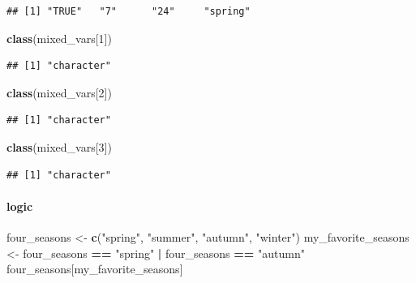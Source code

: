\documentclass[
]{book}
\newenvironment{Shaded}{\begin{snugshade}}{\end{snugshade}}
\newcommand{\DecValTok}[1]{\textcolor[rgb]{0.00,0.00,0.81}{#1}}
\newcommand{\FunctionTok}[1]{\textcolor[rgb]{0.13,0.29,0.53}{\textbf{#1}}}
\newcommand{\NormalTok}[1]{#1}
\newcommand{\OtherTok}[1]{\textcolor[rgb]{0.56,0.35,0.01}{#1}}
\newcommand{\SpecialCharTok}[1]{\textcolor[rgb]{0.81,0.36,0.00}{\textbf{#1}}}
\newcommand{\StringTok}[1]{\textcolor[rgb]{0.31,0.60,0.02}{#1}}
\theoremstyle{definition}
\theoremstyle{definition}
\theoremstyle{definition}
\theoremstyle{definition}
\theoremstyle{remark}
\begin{document}
\begin{verbatim}
## [1] "TRUE"   "7"      "24"     "spring"
\end{verbatim}

\begin{Shaded}
\begin{Highlighting}[]
\FunctionTok{class}\NormalTok{(mixed\_vars[}\DecValTok{1}\NormalTok{])}
\end{Highlighting}
\end{Shaded}

\begin{verbatim}
## [1] "character"
\end{verbatim}

\begin{Shaded}
\begin{Highlighting}[]
\FunctionTok{class}\NormalTok{(mixed\_vars[}\DecValTok{2}\NormalTok{])}
\end{Highlighting}
\end{Shaded}

\begin{verbatim}
## [1] "character"
\end{verbatim}

\begin{Shaded}
\begin{Highlighting}[]
\FunctionTok{class}\NormalTok{(mixed\_vars[}\DecValTok{3}\NormalTok{])}
\end{Highlighting}
\end{Shaded}

\begin{verbatim}
## [1] "character"
\end{verbatim}

\hypertarget{logic}{%
\paragraph{logic}\label{logic}}

\begin{Shaded}
\begin{Highlighting}[]
\NormalTok{four\_seasons }\OtherTok{\textless{}{-}} \FunctionTok{c}\NormalTok{(}\StringTok{"spring"}\NormalTok{, }\StringTok{"summer"}\NormalTok{, }\StringTok{"autumn"}\NormalTok{, }\StringTok{"winter"}\NormalTok{)}
\NormalTok{my\_favorite\_seasons }\OtherTok{\textless{}{-}}\NormalTok{ four\_seasons }\SpecialCharTok{==} \StringTok{"spring"} \SpecialCharTok{|}\NormalTok{ four\_seasons }\SpecialCharTok{==} \StringTok{"autumn"}
\NormalTok{four\_seasons[my\_favorite\_seasons]}
\end{Highlighting}
\end{Shaded}
\end{document}
